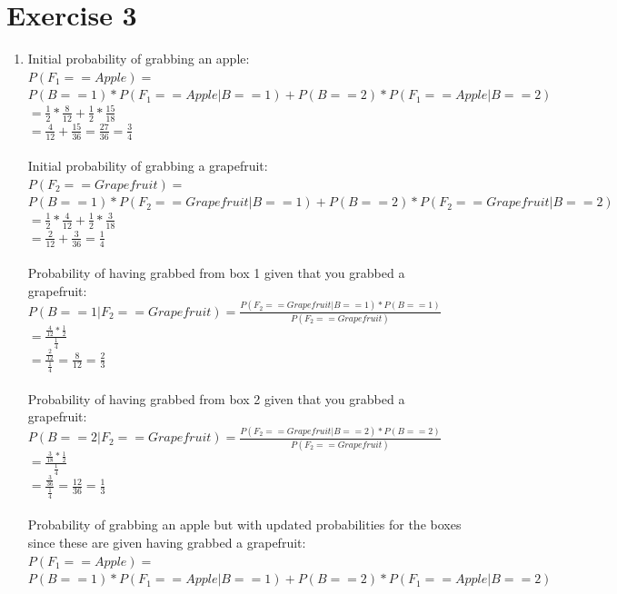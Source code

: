 \documentclass[a4paper,11pt]{article}
\theoremstyle{mytheor}
\begin{document}
\section*{Exercise 3}
\begin{enumerate}
\item Initial probability of grabbing an apple:\\
$P(F_1 == Apple) =$\\
$P(B == 1) * P(F_1 == Apple | B == 1) + P(B == 2) * P(F_1 == Apple | B == 2)$ \\
$= \frac{1}{2} * \frac{8}{12} + \frac{1}{2} * \frac{15}{18}$ \\
$= \frac{4}{12} + \frac{15}{36} = \frac{27}{36} = \frac{3}{4}$\\
\\
Initial probability of grabbing a grapefruit:\\
$P(F_2 == Grapefruit) = $\\
$P(B == 1) * P(F_2 == Grapefruit | B == 1) + P(B == 2) * P(F_2 == Grapefruit | B == 2)$ \\
$= \frac{1}{2} * \frac{4}{12} + \frac{1}{2} * \frac{3}{18}$ \\
$= \frac{2}{12} + \frac{3}{36} = \frac{1}{4}$\\
\\
Probability of having grabbed from box 1 given that you grabbed a grapefruit:\\
$P(B == 1 | F_2 == Grapefruit) = \frac{P(F_2 == Grapefruit | B == 1) * P(B == 1)}{P(F_2 == Grapefruit)}$\\
$= \frac{\frac{4}{12} * \frac{1}{2}}{\frac{1}{4}}$\\
$= \frac{\frac{2}{12}}{\frac{1}{4}} = \frac{8}{12} = \frac{2}{3}$\\
\\
Probability of having grabbed from box 2 given that you grabbed a grapefruit:\\
$P(B == 2 | F_2 == Grapefruit) = \frac{P(F_2 == Grapefruit | B == 2) * P(B == 2)}{P(F_2 == Grapefruit)}$\\
$= \frac{\frac{3}{18} * \frac{1}{2}}{\frac{1}{4}}$\\
$= \frac{\frac{3}{36}}{\frac{1}{4}} = \frac{12}{36} = \frac{1}{3}$\\
\\
Probability of grabbing an apple but with updated probabilities for the boxes since these are given having grabbed a grapefruit:\\
$P(F_1 == Apple) = $\\
$P(B == 1) * P(F_1 == Apple | B == 1) + P(B == 2) * P(F_1 == Apple | B == 2)$ \\

\end{enumerate}
\end{document}
